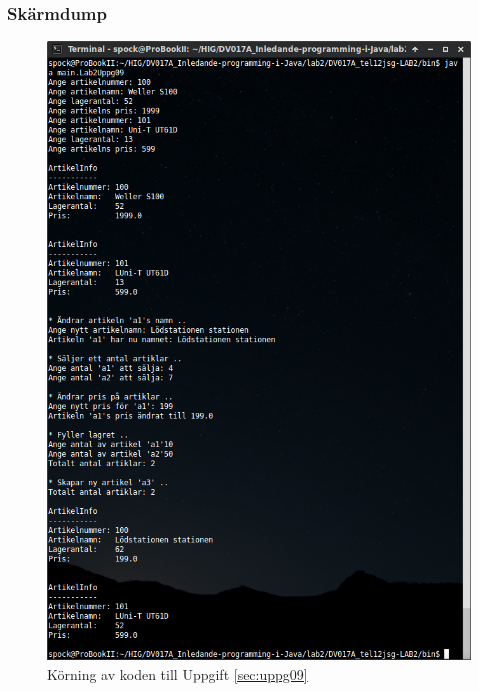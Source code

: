 \subsubsection{Skärmdump}
\begin{figure}[htbp]
    \centering
        \includegraphics[width=\linewidth]{img/09.png}
    \caption{Körning av koden till Uppgift \ref{sec:uppg09}}
    \label{fig:uppg09-screenshot}
\end{figure}

